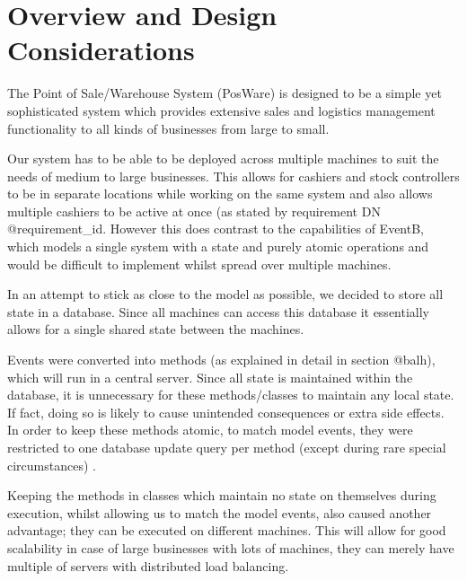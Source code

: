 \documentclass[a4paper]{article}
\begin{document}
\tableofcontents
\pagebreak


\setcounter{page}{1}     %
\renewcommand{\thepage}{\arabic{page}}  %


\section{Overview and Design Considerations}

The Point of Sale/Warehouse System (PosWare) is designed to be a simple yet sophisticated system which provides extensive sales and logistics management functionality to all kinds of businesses from large to small. 

Our system has to be able to be deployed across multiple machines to suit the needs of medium to large businesses. This allows for cashiers and stock controllers to be in separate locations while working on the same system and also allows multiple cashiers to be active at once (as stated by requirement DN {{@requirement_id}}. However this does contrast to the capabilities of EventB, which models a single system with a state and purely atomic operations and would be difficult to implement whilst spread over multiple machines. 

In an attempt to stick as close to the model as possible, we decided to store all state in a database. Since all machines can access this database it essentially allows for a single shared state between the machines.

Events were converted into methods (as explained in detail in section {@balh}), which will run in a central server. Since all state is maintained within the database, it is unnecessary for these methods/classes to maintain any local state. If fact, doing so is likely to cause unintended consequences or extra side effects. In order to keep these methods atomic, to match model events, they were restricted to one database update query per method (except during rare special circumstances) .

Keeping the methods in classes which maintain no state on themselves during execution, whilst allowing us to match the model events, also caused another advantage; they can be executed on different machines. This will allow for good scalability in case of large businesses with lots of machines, they can merely have multiple of servers with distributed load balancing. 
\end{document}
